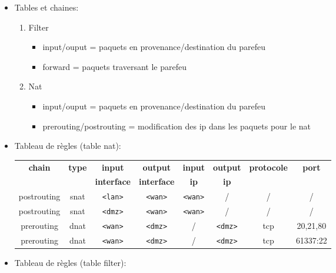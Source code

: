 \documentclass[a4paper]{article}
\begin{document}
\begin{itemize}
\item Tables et chaines:
\begin{enumerate}
    \item Filter
    \begin{itemize}
        \item input/ouput = paquets en provenance/destination du parefeu
        \item forward = paquets traversant le parefeu
    \end{itemize}
    \item Nat
    \begin{itemize}
        \item input/ouput = paquets en provenance/destination du parefeu
        \item prerouting/postrouting = modification des ip dans les paquets pour le nat
    \end{itemize}
\end{enumerate}


\item Tableau de règles (table nat):
\begin{center} \begin{tabular}{|c|c|c|c|c|c|c|c|} \hline

    \textbf{chain} & \textbf{type} & \textbf{input} & \textbf{output} & \textbf{input} & \textbf{output} & \textbf{protocole} & \textbf{port} \\
    && \textbf{interface} & \textbf{interface} & \textbf{ip} & \textbf{ip} &&
    \\ \hline \hline

    postrouting & snat & \texttt{<lan>} & \texttt{<wan>} & \texttt{<wan>} & / & / & / \\ \hline
    postrouting & snat & \texttt{<dmz>} & \texttt{<wan>} & \texttt{<wan>} & / & / & /
    \\ \hline \hline

    prerouting & dnat & \texttt{<wan>} & \texttt{<dmz>} & / & \texttt{<dmz>} & tcp & 20,21,80 \\ \hline
    prerouting & dnat & \texttt{<wan>} & \texttt{<dmz>} & / & \texttt{<dmz>} & tcp & 61337:22 \\ \hline

\end{tabular} \end{center}


\newpage


\item Tableau de règles (table filter):
\begin{center} \begin{tabular}{|c|c|c|c|c|c|c|c|c|} \hline


\end{tabular}
\end{center}
\end{itemize}
\end{document}
